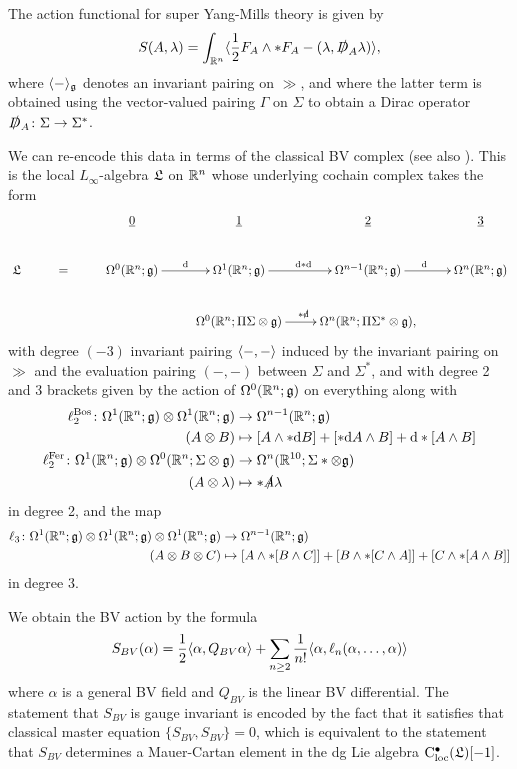 \documentclass[10pt, oneside]{article}
\begin{document}
The action functional for super Yang-Mills theory is given by
\[S(A,\lambda) = \int_{\mathbb R^{n}} \langle \frac{1}{2} F_A \wedge \ast F_A - (\lambda, \slashed{D}_A \lambda)\rangle,\]
where $\langle - \rangle_\mathfrak g$ denotes an invariant pairing on $\gg$, and where the latter term is obtained using the vector-valued pairing $\Gamma$ on $\Sigma$ to obtain a Dirac operator $\slashed{D}_A \colon \Sigma \to \Sigma^*$. 

We can re-encode this data in terms of the classical BV complex (see also \cite[Section 3.1]{ElliottYoo1}).  
This is the local $L_\infty$-algebra $\mathfrak L$ on $\mathbb R^{n}$ whose underlying cochain complex takes the form
\[
\xymatrix{
& & \ul{0} & \ul{1} & \ul{2} & \ul{3} \\
\fL & = & \Omega^0(\RR^{n}; \gg) \ar[r]^{\d} &\Omega^1(\RR^{n}; \gg) \ar[r]^{\d \ast \d} &\Omega^{n-1}(\RR^{n}; \gg) \ar[r]^{\d} &\Omega^{n}(\RR^{n}; \gg) \\
& & &\Omega^0(\RR^{n}; \Pi \Sigma \otimes \gg) \ar[r]^{\ast \sd \d} &\Omega^{n}(\RR^{n}; \Pi \Sigma^* \otimes \gg), &
}\]
with degree $(-3)$ invariant pairing $\langle-,-\rangle$ induced by the invariant pairing on $\gg$ and the evaluation pairing $(-,-)$ between $\Sigma$ and $\Sigma^*$, and with degree 2 and 3 brackets given by the action of $\Omega^0(\mathbb R^{n}; \mathfrak{g})$ on everything along with
\begin{align*}
\ell_2^{\mathrm{Bos}} \colon \Omega^1(\mathbb R^{n};\mathfrak{g}) \otimes \Omega^1(\mathbb R^{n};\mathfrak{g}) &\to \Omega^{n-1}(\mathbb R^{n};\mathfrak{g}) \\
(A \otimes B) &\mapsto [A \wedge \ast \mathrm{d} B] + [\ast \mathrm{d}  A \wedge B] + \mathrm{d} \ast[A \wedge B] \\
\ell_2^{\mathrm{Fer}} \colon \Omega^1(\mathbb R^{n};\mathfrak{g}) \otimes \Omega^0(\mathbb R^{n}; \Sigma \otimes \mathfrak{g}) &\to \Omega^{n}(\mathbb R^{10}; \Sigma* \otimes \mathfrak{g}) \\
(A \otimes \lambda) &\mapsto \ast \slashed{A} \lambda
\end{align*}
in degree 2, and the map
\begin{align*}
\ell_3 \colon \Omega^1(\mathbb R^{n};\mathfrak{g}) \otimes \Omega^1(\mathbb R^{n};\mathfrak{g}) \otimes \Omega^1(\mathbb R^{n};\mathfrak{g}) &\to \Omega^{n-1}(\mathbb R^{n};\mathfrak{g}) \\
(A \otimes B \otimes C) &\mapsto [A \wedge \ast[B \wedge C]] + [B \wedge \ast[C \wedge A]] + [C \wedge \ast[A \wedge B]]
\end{align*}
in degree 3.

We obtain the BV action by the formula
\[
S_{BV} (\alpha) = \frac{1}{2} \langle\alpha , Q_{BV} \alpha\rangle + \sum_{n \geq 2} \frac{1}{n!} \langle\alpha, \ell_n(\alpha,\ldots, \alpha)\rangle 
\]
where $\alpha$ is a general BV field and $Q_{BV}$ is the linear BV differential. 
The statement that $S_{BV}$ is gauge invariant is encoded by the fact that it satisfies that classical master equation $\{S_{BV}, S_{BV}\} = 0$, which is equivalent to the statement that $S_{BV}$ determines a Mauer-Cartan element in the dg Lie algebra ${\rm C}_{\rm loc}^\bullet(\mathfrak L)[-1]$.
\end{document}
